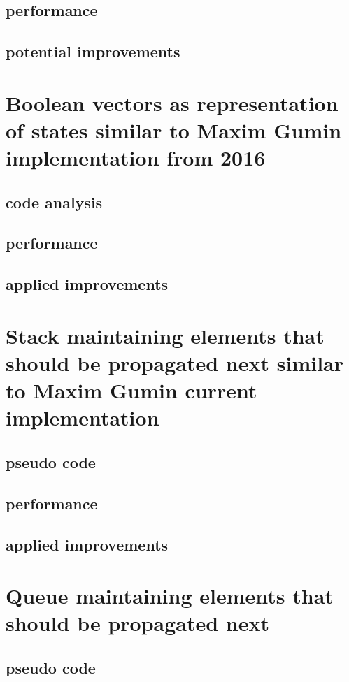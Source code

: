 \documentclass[shortabstract, english, inz]{iithesis}
\begin{document}
        \subsection{performance}
        \subsection{potential improvements}
    \section{Boolean vectors as representation of states \fmlinebreak similar to Maxim Gumin implementation from 2016}
        \subsection{code analysis}
        \subsection{performance}
        \subsection{applied improvements}
    \section{Stack maintaining elements that should be propagated next \fmlinebreak similar to Maxim Gumin current implementation}
    \label{stack}
        \subsection{pseudo code}
        \subsection{performance}
        \subsection{applied improvements}
    \section{Queue maintaining elements that should be propagated next}
    \label{queue}
        \subsection{pseudo code}
\end{document}
